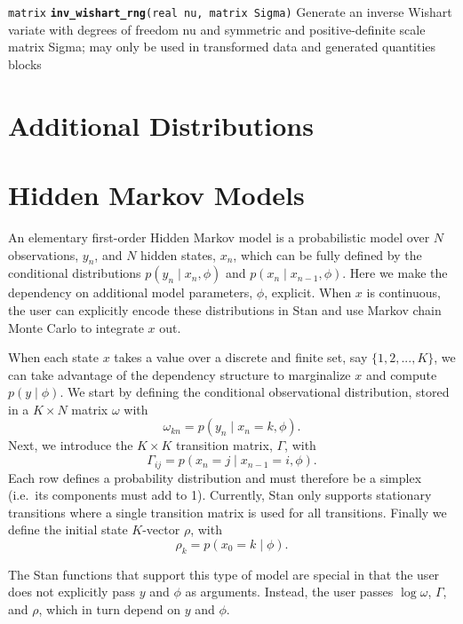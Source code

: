 \documentclass[
  10pt,
]{book}
\begin{document}
\texttt{matrix} \textbf{\texttt{inv\_wishart\_rng}}\texttt{(real\ nu,\ matrix\ Sigma)}\newline
Generate an inverse Wishart variate with degrees of freedom nu and
symmetric and positive-definite scale matrix Sigma; may only be used
in transformed data and generated quantities blocks

\hypertarget{additional-distributions}{%
\chapter*{Additional Distributions}\label{additional-distributions}}

\hypertarget{hidden-markov-models}{%
\chapter{Hidden Markov Models}\label{hidden-markov-models}}

An elementary first-order Hidden Markov model
is a probabilistic model over
\(N\) observations, \(y_n\), and \(N\) hidden states, \(x_n\),
which can be fully defined by the conditional distributions
\(p(y_n \mid x_n, \phi)\) and \(p(x_n \mid x_{n - 1}, \phi)\).
Here we make the dependency on additional model parameters, \(\phi\),
explicit.
When \(x\) is continuous, the user can explicitly encode these distributions
in Stan and use Markov chain Monte Carlo to integrate \(x\) out.

When each state \(x\) takes a value over a discrete and finite set, say \(\{1, 2, ..., K\}\),
we can take advantage of the dependency structure
to marginalize \(x\) and compute \(p(y \mid \phi)\).
We start by defining the conditional observational distribution,
stored in a \(K \times N\) matrix \(\omega\) with
\[
\omega_{kn} = p(y_n \mid x_n = k, \phi).
\]
Next, we introduce the \(K \times K\) transition matrix, \(\Gamma\), with
\[
  \Gamma_{ij} = p(x_n = j \mid x_{n - 1} = i, \phi).
\]
Each row defines a probability distribution
and must therefore be a simplex (i.e.~its components must add to 1).
Currently, Stan only supports stationary transitions where a single
transition matrix is used for all transitions.
Finally we define the initial state \(K\)-vector \(\rho\), with
\[
  \rho_k = p(x_0 = k \mid \phi).
\]

The Stan functions that support this type of model are special
in that the user does not explicitly pass \(y\) and \(\phi\) as arguments.
Instead, the user passes \(\log \omega\), \(\Gamma\), and \(\rho\),
which in turn depend on \(y\) and \(\phi\).
\end{document}
